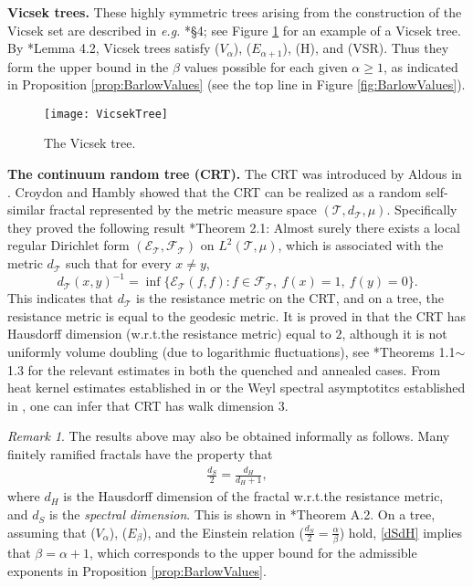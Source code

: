 \documentclass[11pt]{amsart}
\theoremstyle{plain}
\theoremstyle{definition}
\theoremstyle{remark}
\newtheorem{remark}[lemma]{Remark}
\begin{document}
\textbf{Vicsek trees.} These highly symmetric trees arising from the construction of the Vicsek set are described in \emph{e.g.\@} \cite{BarlowValues}*{\S4}; see Figure \ref{fig:Vicsek} for an example of a Vicsek tree. By \cite{BarlowValues}*{Lemma 4.2}, Vicsek trees satisfy ($V_\alpha$), ($E_{\alpha+1}$), (H), and (VSR). Thus they form the upper bound in the $\beta$ values possible for each given $\alpha\geq 1$, as indicated in Proposition \ref{prop:BarlowValues} (see the top line in Figure \ref{fig:BarlowValues}).

\begin{figure}
\centering
\texttt{[image: VicsekTree]}
\caption{The Vicsek tree.}
\label{fig:Vicsek}
\end{figure}

\textbf{The continuum random tree (CRT).} The CRT was introduced by Aldous in \cites{AldousCRT1, AldousCRT2, AldousCRT3}. Croydon and Hambly \cite{CH08} showed that the CRT can be realized as a random self-similar fractal represented by the metric measure space $(\mathcal{T}, d_\mathcal{T}, \mu)$. Specifically they proved the following result \cite{CH08}*{Theorem 2.1}: Almost surely there exists a local regular Dirichlet form $(\mathcal{E}_\mathcal{T}, \mathcal{F}_\mathcal{T})$ on $L^2(\mathcal{T}, \mu)$, which is associated with the metric $d_\mathcal{T}$ such that for every $x\neq y$,
\[
d_{\mathcal{T}}(x,y)^{-1} = \inf\{\mathcal{E}_\mathcal{T}(f,f): f\in \mathcal{F}_\mathcal{T},~f(x)=1,~f(y)=0\}.
\] 
This indicates that $d_\mathcal{T}$ is the resistance metric on the CRT, and on a tree, the resistance metric is equal to the geodesic metric. It is proved in \cite{DuquesneLeGall} that the  CRT has Hausdorff dimension (w.r.t.\@ the resistance metric) equal to $2$, although it is not uniformly volume doubling (due to logarithmic fluctuations), see \cite{Croydon08}*{Theorems 1.1$\sim$1.3} for the relevant estimates in both the quenched and annealed cases. From heat kernel estimates established in \cite{Croydon08} or the Weyl spectral asymptotitcs established in \cite{CH08}, one can infer that CRT has walk dimension $3$.

\begin{remark}
The results above may also be obtained informally as follows. Many finitely ramified fractals have the property that
\begin{align}
\label{dSdH}
\frac{d_S}{2} = \frac{d_H}{d_H+1},
\end{align}
where $d_H$ is the Hausdorff dimension of the fractal w.r.t.\@ the resistance metric, and $d_S$ is the \emph{spectral dimension}. This is shown in \cite{KigamiLapidus}*{Theorem A.2}. On a tree, assuming that ($V_\alpha$), ($E_\beta$), and the Einstein relation ($\frac{d_S}{2} = \frac{\alpha}{\beta}$) hold, \eqref{dSdH} implies that $\beta=\alpha+1$, which corresponds to the upper bound for the admissible exponents in Proposition \ref{prop:BarlowValues}.
\end{remark}
\end{document}
